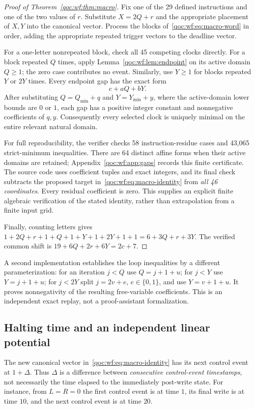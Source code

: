 \documentclass[11pt,letterpaper]{article}
\theoremstyle{definition}
\theoremstyle{remark}
\begin{document}
\begin{proof}[Proof of Theorem~\ref{qoc:wf:thm:macro}]
Fix one of the 29 defined instructions and one of the two values of $r$. Substitute $X=2Q+r$ and the appropriate placement of $X,Y$ into the canonical vector. Process the blocks of~\eqref{qoc:wf:eq:macro-word} in order, adding the appropriate repeated trigger vectors to the deadline vector.

For a one-letter nonrepeated block, check all 45 competing clocks directly. For a block repeated $Q$ times, apply Lemma~\ref{qoc:wf:lem:endpoint} on its active domain $Q\ge1$; the zero case contributes no event. Similarly, use $Y\ge1$ for blocks repeated $Y$ or $2Y$ times. Every endpoint gap has the exact form
\[
 c+aQ+bY.
\]
After substituting $Q=Q_{\min}+q$ and $Y=Y_{\min}+y$, where the active-domain lower bounds are $0$ or $1$, each gap has a positive integer constant and nonnegative coefficients of $q,y$. Consequently every selected clock is uniquely minimal on the entire relevant natural domain.

For full reproducibility, the verifier checks 58 instruction-residue cases and 43,065 strict-minimum inequalities. There are 64 distinct affine forms when their active domains are retained; Appendix~\ref{qoc:wf:app:gaps} records this finite certificate. The source code uses coefficient tuples and exact integers, and its final check subtracts the proposed target in~\eqref{qoc:wf:eq:macro-identity} from \emph{all 46 coordinates}. Every residual coefficient is zero. This supplies an explicit finite algebraic verification of the stated identity, rather than extrapolation from a finite input grid.

Finally, counting letters gives $1+2Q+r+1+Q+1+Y+1+2Y+1+1=6+3Q+r+3Y$. The verified common shift is $19+6Q+2r+6Y=2c+7$.
\end{proof}

A second implementation establishes the loop inequalities by a different parameterization: for an iteration $j<Q$ use $Q=j+1+u$; for $j<Y$ use $Y=j+1+u$; for $j<2Y$ split $j=2v+e$, $e\in\{0,1\}$, and use $Y=v+1+u$. It proves nonnegativity of the resulting free-variable coefficients. This is an independent exact replay, not a proof-assistant formalization.

\subsection{Halting time and an independent linear potential}
The new canonical vector in~\eqref{qoc:wf:eq:macro-identity} has its next control event at $1+\Delta$. Thus $\Delta$ is a difference between \emph{consecutive control-event timestamps}, not necessarily the time elapsed to the immediately post-write state. For instance, from $L=R=0$ the first control event is at time $1$, its final write is at time $10$, and the next control event is at time $20$.
\end{document}
